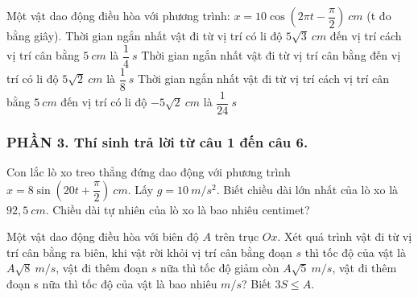 \begin{ex}
	Một vật dao động điều hòa với phương trình: $x=10 \cos \left(2 \pi t-\dfrac{\pi}{2}\right)\ cm$ (t đo bằng giây).
		{Thời gian ngắn nhất vật đi từ vị trí có li độ $5 \sqrt{3} \ cm$ đến vị trí cách vị trí cân bằng $5 \ cm$ là $\dfrac{1}{4} \ s$}
		{\True Thời gian ngắn nhất vật đi từ vị trí cân bằng đến vị trí có li độ $5 \sqrt{2} \ cm$ là $\dfrac{1}{8}\ s$}
		{\True Thời gian ngắn nhất vật đi từ vị trí cách vị trí cân bằng $5 \ cm$ đến vị trí có li độ $-5 \sqrt{2} \ cm$ là $\dfrac{1}{24} \ s$}
	
	\loigiai{
		\begin{itemchoice}
		\itemch 
		\itemch 
		\itemch 
		\itemch 
	\end{itemchoice}
	}
	\end{ex}
\subsubsection*{PHẦN 3. Thí sinh trả lời từ câu 1 đến câu 6.}
\setcounter{ex}{0}

\begin{ex}
	Con lắc lò xo treo thẳng đứng dao động với phương trình $x=8 \sin \left(20 t+\dfrac{\pi}{2}\right)\ cm$. Lấy $g=10 \ m/s^2$. Biết chiều dài lớn nhất của lò xo là $92,5 \ cm$. Chiều dài tự nhiên của lò xo là bao nhiêu centimet?
\end{ex}
\begin{ex}%
	Một vật dao động điều hòa với biên độ $A$ trên trục $Ox$. Xét quá trình vật đi từ vị trí cân bằng ra biên, khi vật rời khỏi vị trí cân bằng đoạn $s$ thì tốc độ của vật là $A\sqrt{8}\ m/s$, vật đi thêm đoạn $s$ nữa thì tốc độ giảm còn $A\sqrt{5}\ m/s$, vật đi thêm đoạn s nữa thì tốc độ của vật là bao nhiêu $m/s$? Biết $3S \leq A$.
\end{ex}


